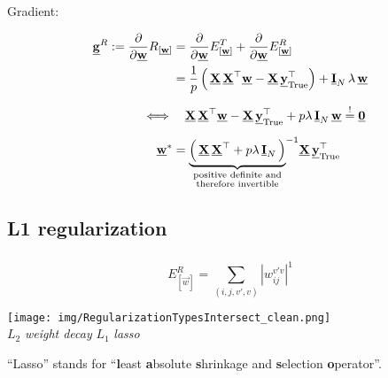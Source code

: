 \begin{frame}

Gradient:

\begin{align}
\underline{\mathbf{g}}^R :=  \frac{\partial}{\partial \underline{\mathbf{w}}} R_{[\underline{\mathbf{w}}]}
&= \frac{\partial}{\partial \underline{\mathbf{w}}} E^T_{[\underline{\mathbf{w}}]} + \frac{\partial}{\partial \underline{\mathbf{w}}} E^R_{[\underline{\mathbf{w}}]}\\
&= \frac{1}{p} \left(\, \underline{\mathbf{X}} \, \underline{\mathbf{X}}^\top \underline{\mathbf{w}} - \underline{\mathbf{X}}\, \underline{\mathbf{y}}_{\text{True}}^\top \right) + \underline{\mathbf{I}}_N \, \lambda \, \underline{\mathbf{w}}\\[2mm]
\iff& \quad \underline{\mathbf{X}} \, \underline{\mathbf{X}}^\top \underline{\mathbf{w}} - \underline{\mathbf{X}}\, \underline{\mathbf{y}}_{\text{True}}^\top + p \lambda \, \underline{\mathbf{I}}_N \,  \underline{\mathbf{w}} \stackrel{\mathrm{!}}{=} \underline{\mathbf{0}}\\[2mm]
\underline{\mathbf{w}}^* &=  {\underbrace{
\left(\, \underline{\mathbf{X}} \, \underline{\mathbf{X}}^\top + p \lambda \, \underline{\mathbf{I}}_N \,  \right)
}_{
\substack{
\text{positive definite and}\\
\text{therefore invertible}\\
}
}
}^{-1} \underline{\mathbf{X}} \, \underline{\mathbf{y}}_{\mathrm{True}}^{\top}
\end{align}

\end{frame}

\subsection{L1 regularization}

\begin{frame}\frametitle{\subsecname}

	\begin{equation}
		E^R_{[\vec w]} = \sum\limits_{(i, j, v', v)} {|w_{ij}^{v'v}|}^1
	\end{equation}
	
	\begin{center}
		\texttt{[image: img/RegularizationTypesIntersect\_clean.png]} \\[-2mm]
		{ \footnotesize $L_2$ {\em weight decay}
			\hspace{1cm} $L_1$ {\em lasso}\hspace{1cm} $ $}
	\end{center}
	
	``Lasso'' stands for ``\textbf{l}east \textbf{a}bsolute \textbf{s}hrinkage and \textbf{s}election \textbf{o}perator''.


\end{frame}

